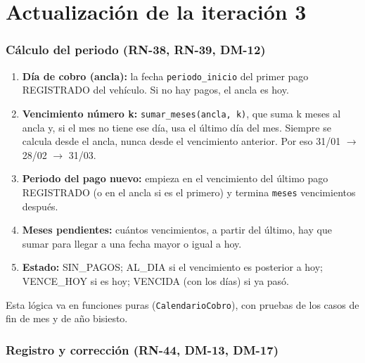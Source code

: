 \section{Actualización de la iteración 3}


\subsubsection{Cálculo del periodo (RN-38, RN-39, DM-12)}

\begin{enumerate}
  \item \textbf{Día de cobro (ancla):} la fecha \texttt{periodo\_inicio} del primer pago REGISTRADO del vehículo. Si no hay pagos, el ancla es hoy.
  \item \textbf{Vencimiento número k:} \texttt{sumar\_meses(ancla, k)}, que suma k meses al ancla y, si el mes no tiene ese día, usa el último día del mes. Siempre se calcula desde el ancla, nunca desde el vencimiento anterior. Por eso 31/01 $\rightarrow$ 28/02 $\rightarrow$ 31/03.
  \item \textbf{Periodo del pago nuevo:} empieza en el vencimiento del último pago REGISTRADO (o en el ancla si es el primero) y termina \texttt{meses} vencimientos después.
  \item \textbf{Meses pendientes:} cuántos vencimientos, a partir del último, hay que sumar para llegar a una fecha mayor o igual a hoy.
  \item \textbf{Estado:} SIN\_PAGOS; AL\_DIA si el vencimiento es posterior a hoy; VENCE\_HOY si es hoy; VENCIDA (con los días) si ya pasó.
\end{enumerate}

Esta lógica va en funciones puras (\texttt{CalendarioCobro}), con pruebas de los casos de fin de mes y de año bisiesto.


\subsubsection{Registro y corrección (RN-44, DM-13, DM-17)}

